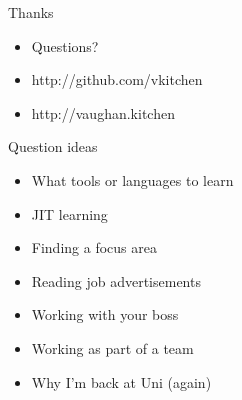 \documentclass{beamer}
\begin{document}
\begin{frame}{Thanks}
\begin{itemize}
\item Questions?
\item http://github.com/vkitchen
\item http://vaughan.kitchen
\end{itemize}
\end{frame}

\begin{frame}{Question ideas}
\begin{itemize}
\item What tools or languages to learn
\item JIT learning
\item Finding a focus area
\item Reading job advertisements
\item Working with your boss
\item Working as part of a team
\item Why I'm back at Uni (again)
\end{itemize}
\end{frame}
\end{document}
